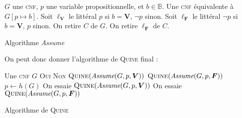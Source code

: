 \begin{algorithm}[H]
	\centering
	\begin{algorithmic}[1]
		\Entree $G$\/ une \textsc{cnf}, $p$\/ une variable propositionnelle, et $b \in \mathds{B}$.
		\Sortie Une \textsc{cnf} équivalente à $G[p\mapsto b]$.
		\State Soit $\ell_{\mathbf{V}}$\/ le littéral $p$\/ si $b = \mathbf{V}$, $\lnot p$\/ sinon.
		\State Soit $\ell_{\mathbf{F}}$\/ le littéral $\lnot p$\/ si $b = \mathbf{V}$, $p$\/ sinon.
				\State On retire $C$\/ de $G$.
			\Else{}
				\State On retire $\ell_{\mathbf{F}}$\/ de $C$.
			\EndIf\EndIf
		\EndFor
	\end{algorithmic}
	\caption{Algorithme \textit{Assume}}
\end{algorithm}

On peut donc donner l'algorithme de \textsc{Quine} final :

\begin{algorithm}[H]
	\centering
	\begin{algorithmic}[1]
		\Entree Une \textsc{cnf} $G$\/ 
		\State\Return \textsc{Oui}
		\Else
			\State\Return \textsc{Non}
					\State $\textsc{Quine}(\textit{Assume}(G,p,\mathbf{V}))$\/
					\State $\textsc{Quine}(\textit{Assume}(G,p,\mathbf{F}))$\/
				\EndIf
			\Else
				\State $p \gets h(G)$\/ 
				\State On essaie $\textsc{Quine}(\textit{Assume}(G, p, \mathbf{V}))$\/
				\State On essaie $\textsc{Quine}(\textit{Assume}(G, p, \mathbf{F}))$\/
			\EndIf
		\EndIf
	\end{algorithmic}
	\caption{Algorithme de \textsc{Quine}}
\end{algorithm}
